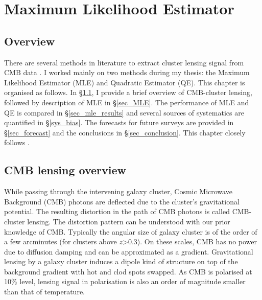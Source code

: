 \chapter{Maximum Likelihood Estimator}
\label{ch:MLE}
\section*{Overview}
There are several methods in literature to extract cluster lensing signal from CMB data \citep{dodelson04, lewis06, baxter15, hu07, melin15,yoo08,horowitz19, raghunathan17a,horowitz19}. 
 I worked mainly on two methods during my thesis: the Maximum Likelihood Estimator (MLE) and Quadratic Estimator (QE). 
This chapter is organised as follows. In \S\ref{cmb_overview}, I provide a brief overview of CMB-cluster lensing, followed by description of MLE in \S\ref{sec_MLE}. The performance of MLE and QE is compared in \S\ref{sec_mle_results} and several sources of systematics are quantified in \S\ref{sys_bias}. The forecasts for future surveys are provided in \S\ref{sec_forecast} and the conclusions in \S\ref{sec_conclusion}. This chapter closely follows \citet{raghunathan17a}.

\section{CMB lensing overview}
\label{cmb_overview}
While passing through the intervening galaxy cluster, Cosmic Microwave Background (CMB) photons are deflected due to the cluster's gravitational potential. 
The resulting distortion in the path of CMB photons is called CMB-cluster lensing. 
The distortion pattern can be understood with our prior knowledge of CMB.
Typically the angular size of galaxy cluster is of the order of a few arcminutes (for clusters above $z$>0.3). On these scales, CMB has no power due to diffusion damping \citep{silk68} and can be approximated as a gradient. 
Gravitational lensing by a galaxy cluster induces a dipole kind of structure on top of the background gradient with hot and clod spots swapped. 
As CMB is polarised at 10\% level, lensing signal in polarisation is also an order of magnitude smaller than that of temperature. 


